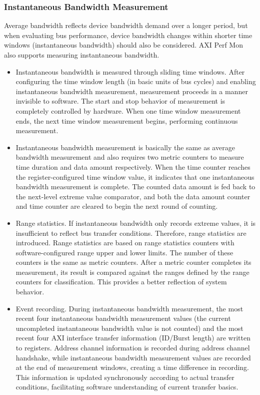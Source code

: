 \documentclass[main\_\_EN.tex]{subfiles}
\begin{document}
\subsubsection{Instantaneous Bandwidth Measurement}
Average bandwidth reflects device bandwidth demand over a longer period, but when evaluating bus performance, device bandwidth changes within shorter time windows (instantaneous bandwidth) should also be considered. AXI Perf Mon also supports measuring instantaneous bandwidth.
\begin{itemize}
    \item Instantaneous bandwidth is measured through sliding time windows. After configuring the time window length (in basic units of bus cycles) and enabling instantaneous bandwidth measurement, measurement proceeds in a manner invisible to software. The start and stop behavior of measurement is completely controlled by hardware. When one time window measurement ends, the next time window measurement begins, performing continuous measurement.
    \item Instantaneous bandwidth measurement is basically the same as average bandwidth measurement and also requires two metric counters to measure time duration and data amount respectively. When the time counter reaches the register-configured time window value, it indicates that one instantaneous bandwidth measurement is complete. The counted data amount is fed back to the next-level extreme value comparator, and both the data amount counter and time counter are cleared to begin the next round of counting.
    \item Range statistics. If instantaneous bandwidth only records extreme values, it is insufficient to reflect bus transfer conditions. Therefore, range statistics are introduced. Range statistics are based on range statistics counters with software-configured range upper and lower limits. The number of these counters is the same as metric counters. After a metric counter completes its measurement, its result is compared against the ranges defined by the range counters for classification. This provides a better reflection of system behavior.
    \item Event recording. During instantaneous bandwidth measurement, the most recent four instantaneous bandwidth measurement values (the current uncompleted instantaneous bandwidth value is not counted) and the most recent four AXI interface transfer information (ID/Burst length) are written to registers. Address channel information is recorded during address channel handshake, while instantaneous bandwidth measurement values are recorded at the end of measurement windows, creating a time difference in recording. This information is updated synchronously according to actual transfer conditions, facilitating software understanding of current transfer basics.

\end{itemize}
\end{document}
